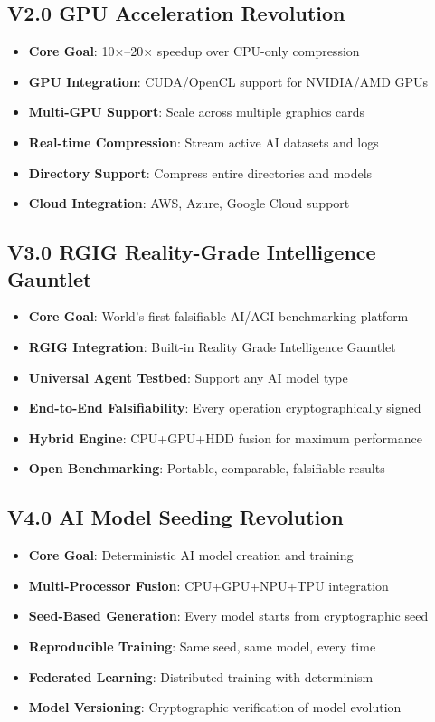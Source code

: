 \documentclass[12pt,a4paper]{article}
\begin{document}
\subsection{V2.0 GPU Acceleration Revolution}
\begin{itemize}
    \item \textbf{Core Goal}: 10×–20× speedup over CPU-only compression
    \item \textbf{GPU Integration}: CUDA/OpenCL support for NVIDIA/AMD GPUs
    \item \textbf{Multi-GPU Support}: Scale across multiple graphics cards
    \item \textbf{Real-time Compression}: Stream active AI datasets and logs
    \item \textbf{Directory Support}: Compress entire directories and models
    \item \textbf{Cloud Integration}: AWS, Azure, Google Cloud support
\end{itemize}

\subsection{V3.0 RGIG Reality-Grade Intelligence Gauntlet}
\begin{itemize}
    \item \textbf{Core Goal}: World's first falsifiable AI/AGI benchmarking platform
    \item \textbf{RGIG Integration}: Built-in Reality Grade Intelligence Gauntlet
    \item \textbf{Universal Agent Testbed}: Support any AI model type
    \item \textbf{End-to-End Falsifiability}: Every operation cryptographically signed
    \item \textbf{Hybrid Engine}: CPU+GPU+HDD fusion for maximum performance
    \item \textbf{Open Benchmarking}: Portable, comparable, falsifiable results
\end{itemize}

\subsection{V4.0 AI Model Seeding Revolution}
\begin{itemize}
    \item \textbf{Core Goal}: Deterministic AI model creation and training
    \item \textbf{Multi-Processor Fusion}: CPU+GPU+NPU+TPU integration
    \item \textbf{Seed-Based Generation}: Every model starts from cryptographic seed
    \item \textbf{Reproducible Training}: Same seed, same model, every time
    \item \textbf{Federated Learning}: Distributed training with determinism
    \item \textbf{Model Versioning}: Cryptographic verification of model evolution
\end{itemize}
\end{document}
